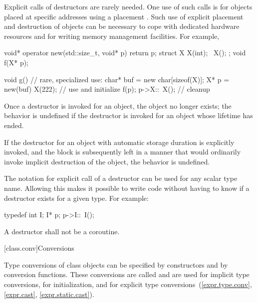 \pnum
\begin{note}
%
Explicit calls of destructors are rarely needed.
One use of such calls is for objects placed at specific
addresses using a placement
.
Such use of explicit placement and destruction of objects can be necessary
to cope with dedicated hardware resources and for writing memory management
facilities.
For example,
\begin{codeblock}
void* operator new(std::size_t, void* p) { return p; }
struct X {
  X(int);
  ~X();
};
void f(X* p);

void g() {                      // rare, specialized use:
  char* buf = new char[sizeof(X)];
  X* p = new(buf) X(222);       // use  and initialize
  f(p);
  p->X::~X();                   // cleanup
}
\end{codeblock}
\end{note}

\pnum
Once a destructor is invoked for an object, the object no longer exists;
the behavior is undefined if the destructor is invoked
for an object whose lifetime has ended.
\begin{example}
If the destructor for an object with automatic storage duration is explicitly invoked,
and the block is subsequently left in a manner that would ordinarily
invoke implicit destruction of the object, the behavior is undefined.
\end{example}

\pnum
\begin{note}
%
The notation for explicit call of a destructor can be used for any scalar type
name.
Allowing this makes it possible to write code without having to know if a
destructor exists for a given type.
For example:
\begin{codeblock}
typedef int I;
I* p;
p->I::~I();
\end{codeblock}
\end{note}

\pnum
A destructor shall not be a coroutine.

[class.conv]{Conversions}

\pnum
{}%
%
%
%
Type conversions of class objects can be specified by constructors and
by conversion functions.
These conversions are called
and are used for implicit type conversions,
for initialization,
and for explicit type conversions~(\ref{expr.type.conv}, \ref{expr.cast},
\ref{expr.static.cast}).


